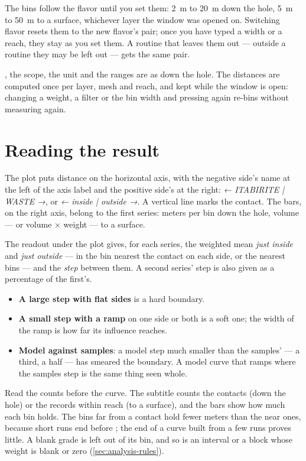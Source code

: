 The bins follow the flavor until you set them: 2~m to 20~m down the hole, 5~m to 50~m to a surface, whichever layer the window was opened on. Switching flavor resets them to the new flavor's pair; once you have typed a width or a reach, they stay as you set them. A routine that leaves them out — outside a routine they may be left out — gets the same pair.

, the scope, the unit and the ranges are as down the hole. The distances are computed once per layer, mesh and reach, and kept while the window is open: changing a weight, a filter or the bin width and pressing  again re-bins without measuring again.

\section{Reading the result}\label{sec:contact-reading}
The plot puts distance on the horizontal axis, with the negative side's name at the left of the axis label and the positive side's at the right: \emph{← ITABIRITE | WASTE →}, or \emph{← inside | outside →}. A vertical line marks the contact. The bars, on the right axis, belong to the first series: meters per bin down the hole, volume — or volume × weight — to a surface.

The readout under the plot gives, for each series, the weighted mean \emph{just inside} and \emph{just outside} — in the bin nearest the contact on each side, or the nearest  bins — and the \emph{step} between them. A second series' step is also given as a percentage of the first's.

\begin{itemize}
\item \textbf{A large step with flat sides} is a hard boundary.
\item \textbf{A small step with a ramp} on one side or both is a soft one; the width of the ramp is how far its influence reaches.
\item \textbf{Model against samples}: a model step much smaller than the samples' — a third, a half — has smeared the boundary. A model curve that ramps where the samples step is the same thing seen whole.
\end{itemize}

Read the counts before the curve. The subtitle counts the contacts (down the hole) or the records within reach (to a surface), and the bars show how much each bin holds. The bins far from a contact hold fewer meters than the near ones, because short runs end before ; the end of a curve built from a few runs proves little. A blank grade is left out of its bin, and so is an interval or a block whose weight is blank or zero (\cref{sec:analysis-rules}).

